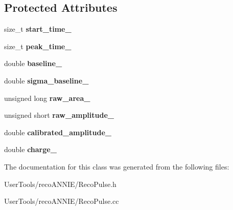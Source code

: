 \subsection*{Protected Attributes}
\begin{DoxyCompactItemize}
\item 
\hypertarget{classannie_1_1RecoPulse_a6090760e41716137b9c3819a420d5eb8}{size\-\_\-t {\bfseries start\-\_\-time\-\_\-}}\label{classannie_1_1RecoPulse_a6090760e41716137b9c3819a420d5eb8}

\item 
\hypertarget{classannie_1_1RecoPulse_a6e94108b50a882445fe12c2ec25c74f9}{size\-\_\-t {\bfseries peak\-\_\-time\-\_\-}}\label{classannie_1_1RecoPulse_a6e94108b50a882445fe12c2ec25c74f9}

\item 
\hypertarget{classannie_1_1RecoPulse_ad4fa13a9012a2dfb87cefea9bb72233b}{double {\bfseries baseline\-\_\-}}\label{classannie_1_1RecoPulse_ad4fa13a9012a2dfb87cefea9bb72233b}

\item 
\hypertarget{classannie_1_1RecoPulse_afb08d645128d1180dfd22c56764902b6}{double {\bfseries sigma\-\_\-baseline\-\_\-}}\label{classannie_1_1RecoPulse_afb08d645128d1180dfd22c56764902b6}

\item 
\hypertarget{classannie_1_1RecoPulse_a1d6a1ab357584189eac4c703a2b2b5ae}{unsigned long {\bfseries raw\-\_\-area\-\_\-}}\label{classannie_1_1RecoPulse_a1d6a1ab357584189eac4c703a2b2b5ae}

\item 
\hypertarget{classannie_1_1RecoPulse_a5b65f34b0033c820b2b4482701147c78}{unsigned short {\bfseries raw\-\_\-amplitude\-\_\-}}\label{classannie_1_1RecoPulse_a5b65f34b0033c820b2b4482701147c78}

\item 
\hypertarget{classannie_1_1RecoPulse_afaab45c845391574f35c93aec9c1f34a}{double {\bfseries calibrated\-\_\-amplitude\-\_\-}}\label{classannie_1_1RecoPulse_afaab45c845391574f35c93aec9c1f34a}

\item 
\hypertarget{classannie_1_1RecoPulse_a29f9e86d00bc1b0d415f27fcbd739596}{double {\bfseries charge\-\_\-}}\label{classannie_1_1RecoPulse_a29f9e86d00bc1b0d415f27fcbd739596}

\end{DoxyCompactItemize}


The documentation for this class was generated from the following files\-:\begin{DoxyCompactItemize}
\item 
User\-Tools/reco\-A\-N\-N\-I\-E/Reco\-Pulse.\-h\item 
User\-Tools/reco\-A\-N\-N\-I\-E/Reco\-Pulse.\-cc\end{DoxyCompactItemize}
